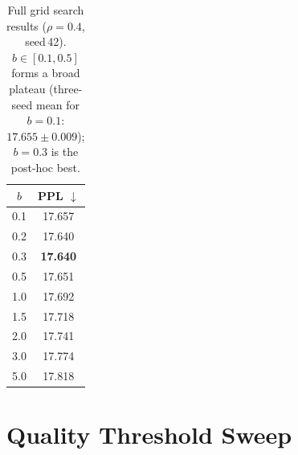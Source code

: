 \begin{table}[h]
\centering
\small
\begin{tabular}{@{}cc@{}}
\toprule
$b$ & PPL $\downarrow$ \\
\midrule
0.1 & 17.657 \\
0.2 & 17.640 \\
0.3 & \textbf{17.640} \\
0.5 & 17.651 \\
1.0 & 17.692 \\
1.5 & 17.718 \\
2.0 & 17.741 \\
3.0 & 17.774 \\
5.0 & 17.818 \\
\bottomrule
\end{tabular}
\caption{Full grid search results ($\rho{=}0.4$, seed\,42).
$b \in [0.1, 0.5]$ forms a broad plateau (three-seed mean for $b{=}0.1$: $17.655 \pm 0.009$); $b{=}0.3$ is the post-hoc best.}
\label{tab:grid_full}
\end{table}

\section{Quality Threshold Sweep}
\label{app:tau_sweep}

\begin{table}[h]
\centering
\small
{}
\caption{Quality threshold sweep ($\nmin{=}2$, $\rho{=}0.4$).
$\Delta$ relative to 3-seed uniform baseline (Holdout 17.694, OWT 18.375, Wiki 15.359).
$^\star$\,$\tau{=}0.7$: 5-seed mean (SD from 5 seeds); $\tau{=}0.8$: 3 from-scratch seeds (Appendix~\ref{app:resume_artifact}). The 5-seed comparison in Table~\ref{tab:main} yields $\Delta{=}{-}0.023$.
Other values from single-seed exploratory sweep (seed\,42, holdout only).
$\tau{=}0.7$ achieves the lowest holdout and largest OOD gains ($|\Delta| \geq 0.028$); $\tau{=}0.8$'s OOD effect is smaller ($|\Delta| \leq 0.009$).}
\label{tab:tau}
\end{table}

